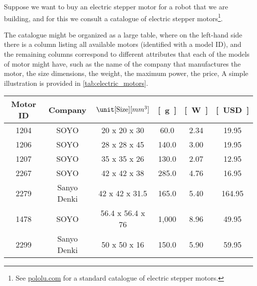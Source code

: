 \begin{example}[Relabelling]
    Suppose we want to buy an electric stepper motor for a robot that we are building, and for this we consult a catalogue of electric stepper motors\footnote{See \href{https://www.pololu.com/category/87/stepper-motors}{pololu.com} for a standard catalogue of electric stepper motors.
    }.

    The catalogue might be organized as a large table, where on the left-hand side there is a column listing all available motors (identified with a model ID), and the remaining columns correspond to different attributes that each of the models of motor might have, such as the name of the company that manufactures the motor, the size dimensions, the weight, the maximum power, the price, \etc
    A simple illustration is provided in \cref{tab:electric_motors}.

    \begin{table*}[h]
        \centering
        \begin{tabular}{c|c|c|c|c|c}
            Motor ID      & Company              & $\unit[\text{Size}]{[mm^3]}$ & \unit[Weight]{[g]} & \unit[Max Power]{[W]}
                          & \unit[Cost]{[USD]} \\
            \hline
            \textsf{1204} & \textsf{SOYO}        & 20 x 20 x 30                 & 60.0               & 2.34                  & 19.95 \\
            \textsf{1206} & \textsf{SOYO}        & 28 x 28 x 45                 & 140.0              & 3.00                  & 19.95 \\
            \textsf{1207} & \textsf{SOYO}        & 35 x 35 x 26                 & 130.0              & 2.07                  & 12.95 \\
            \textsf{2267} & \textsf{SOYO}        & 42 x 42 x 38                 & 285.0              & 4.76                  & 16.95 \\
            \textsf{2279} & \textsf{Sanyo Denki} & 42 x 42 x 31.5               & 165.0              & 5.40                  & 164.95 \\
            \textsf{1478} & \textsf{SOYO}        & 56.4 x 56.4 x 76             & 1,000              & 8.96                  & 49.95 \\
            \textsf{2299} & \textsf{Sanyo Denki} & 50 x 50 x 16                 & 150.0              & 5.90                  & 59.95
        \end{tabular}


\end{table*}
\end{example}
